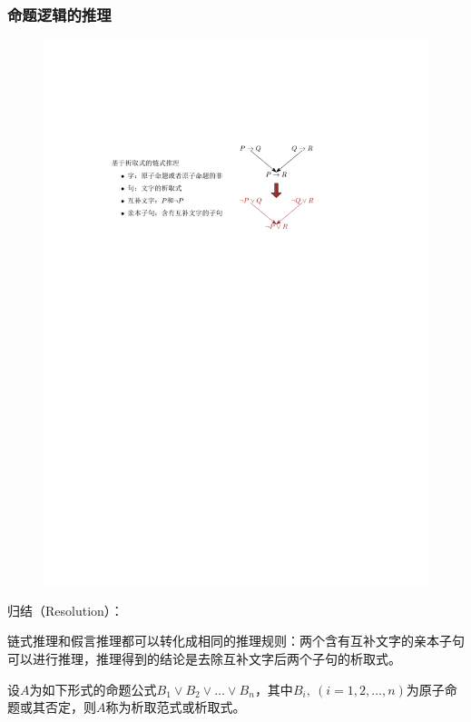 \subsubsection{命题逻辑的推理}
\begin{figure}[htbp]
    \centering
    \includegraphics{image/基于析取式的链式推理.pdf}
\end{figure}
\begin{note}
    归结（Resolution）：

    链式推理和假言推理都可以转化成相同的推理规则：\textcolor{main1}{两个含有互补文字的亲本子句可以进行推理，推理得到的结论是去除互补文字后两个子句的析取式。}
\end{note}
\begin{definition}[析取范式]
    设$A$为如下形式的命题公式$B_1\lor B_2\lor \dots\lor B_n$，其中$B_i,\ (i = 1,2,\dots, n)$为原子命题或其否定，则$A$称为析取范式或析取式。
\end{definition}
